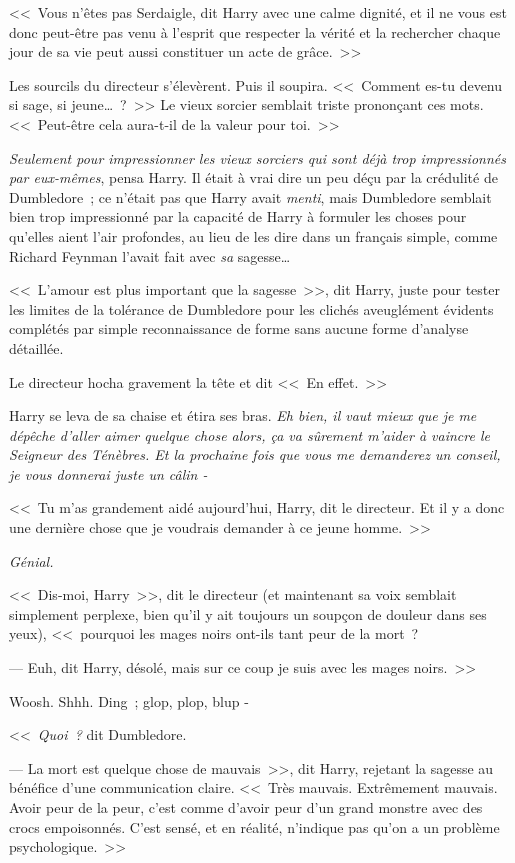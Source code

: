 <<~Vous n'êtes pas Serdaigle, dit Harry avec une calme dignité, et il ne vous est donc peut-être pas venu à l'esprit que respecter la vérité et la rechercher chaque jour de sa vie peut aussi constituer un acte de grâce.~>>

Les sourcils du directeur s'élevèrent. Puis il soupira. <<~Comment es-tu devenu si sage, si jeune…~?~>> Le vieux sorcier semblait triste prononçant ces mots. <<~Peut-être cela aura-t-il de la valeur pour toi.~>>

\emph{Seulement pour impressionner les vieux sorciers qui sont déjà trop impressionnés par eux-mêmes}, pensa Harry. Il était à vrai dire un peu déçu par la crédulité de Dumbledore~; ce n'était pas que Harry avait \emph{menti}, mais Dumbledore semblait bien trop impressionné par la capacité de Harry à formuler les choses pour qu'elles aient l'air profondes, au lieu de les dire dans un français simple, comme Richard Feynman l'avait fait avec \emph{sa} sagesse…

<<~L'amour est plus important que la sagesse~>>, dit Harry, juste pour tester les limites de la tolérance de Dumbledore pour les clichés aveuglément évidents complétés par simple reconnaissance de forme sans aucune forme d'analyse détaillée.

Le directeur hocha gravement la tête et dit <<~En effet.~>>

Harry se leva de sa chaise et étira ses bras. \emph{Eh bien, il vaut mieux que je me dépêche d'aller aimer quelque chose alors, ça va sûrement m'aider à vaincre le Seigneur des Ténèbres. Et la prochaine fois que vous me demanderez un conseil, je vous donnerai juste un câlin -}

<<~Tu m'as grandement aidé aujourd'hui, Harry, dit le directeur. Et il y a donc une dernière chose que je voudrais demander à ce jeune homme.~>>

\emph{Génial.}

<<~Dis-moi, Harry~>>, dit le directeur (et maintenant sa voix semblait simplement perplexe, bien qu'il y ait toujours un soupçon de douleur dans ses yeux), <<~pourquoi les mages noirs ont-ils tant peur de la mort~?

--- Euh, dit Harry, désolé, mais sur ce coup je suis avec les mages noirs.~>>

Woosh. Shhh. Ding~; glop, plop, blup -

<<~\emph{Quoi~?} dit Dumbledore.

--- La mort est quelque chose de mauvais~>>, dit Harry, rejetant la sagesse au bénéfice d'une communication claire. <<~Très mauvais. Extrêmement mauvais. Avoir peur de la peur, c'est comme d'avoir peur d'un grand monstre avec des crocs empoisonnés. C'est sensé, et en réalité, n'indique pas qu'on a un problème psychologique.~>>

